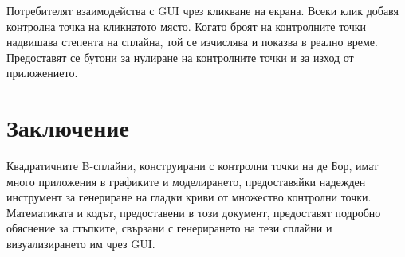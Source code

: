 \documentclass{article}
\begin{document}
Потребителят взаимодейства с GUI чрез кликване на екрана. Всеки клик добавя контролна точка на кликнатото място. Когато броят на контролните точки надвишава степента на сплайна, той се изчислява и показва в реално време. Предоставят се бутони за нулиране на контролните точки и за изход от приложението.

\section{Заключение}
Квадратичните B-сплайни, конструирани с контролни точки на де Бор, имат много приложения в графиките и моделирането, предоставяйки надежден инструмент за генериране на гладки криви от множество контролни точки. Математиката и кодът, предоставени в този документ, предоставят подробно обяснение за стъпките, свързани с генерирането на тези сплайни и визуализирането им чрез GUI.
\end{document}
